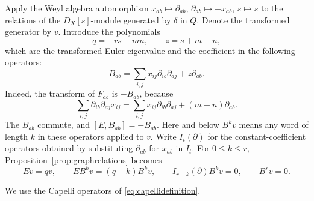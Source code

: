 \documentclass[11pt,a4paper]{article}
\numberwithin{equation}{section}
\theoremstyle{definition}
\begin{document}
Apply the Weyl algebra automorphism
$x_{ab}\mapsto\partial_{ab}$, $\partial_{ab}\mapsto-x_{ab}$, $s\mapsto s$
to the relations of the $D_X[s]$-module generated by $\delta$ in $Q$.
Denote the transformed generator by $v$. Introduce the polynomials
\[
q=-rs-mn,\qquad z=s+m+n,
\]
which are the transformed Euler eigenvalue and the coefficient in the
following operators:
\begin{equation}\label{eq:B}
B_{ab}=\sum_{i,j}x_{ij}\partial_{ib}\partial_{aj}+z\partial_{ab}.
\end{equation}
Indeed, the transform of $F_{ab}$ is $-B_{ab}$, because
\[
\sum_{i,j}\partial_{ib}\partial_{aj}x_{ij}
=\sum_{i,j}x_{ij}\partial_{ib}\partial_{aj}+(m+n)\partial_{ab}.
\]
The $B_{ab}$ commute, and $[E,B_{ab}]=-B_{ab}$. Here and below $B^k v$
means any word of length $k$ in these operators applied to $v$.
Write $I_t(\partial)$ for the constant-coefficient operators
obtained by substituting $\partial_{ab}$ for $x_{ab}$ in $I_t$.
For $0\le k\le r$, Proposition~\ref{prop:graphrelations} becomes
\begin{equation}\label{eq:fourierrelations}
Ev=qv,\qquad EB^kv=(q-k)B^kv,\qquad
I_{r-k}(\partial)B^kv=0,\qquad B^rv=0.
\end{equation}

We use the Capelli operators of \eqref{eq:capellidefinition}.
\end{document}
